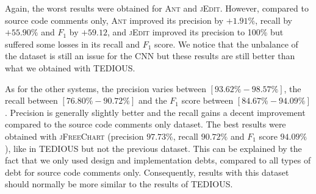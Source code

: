 \begin{table}[t]
	\caption{Within-project prediction: results of CNN for each system using source code with comments}
	\label{tab:comments}
	\centering\scriptsize
	\vspace{-3mm}
\end{table}

Again, the worst results were obtained for \textsc{Ant} and \textsc{jEdit}. However, compared to source code comments only, \textsc{Ant} improved its precision by $+ 1.91\%$, recall by $+ 55.90\%$ and $F_1$ by $+ 59.12$, and \textsc{jEdit} improved its precision to 100\% but suffered some losses in its recall and $F_1$ score. We notice that the unbalance of the dataset is still an issue for the CNN but these results are still better than what we obtained with TEDIOUS.

As for the other systems, the precision varies between $[93.62\%-98.57\%]$, the recall between $[76.80\%-90.72\%]$ and the $F_1$ score between $[84.67\%-94.09\%]$. Precision is generally slightly better and the recall gains a decent improvement compared to the source code comments only dataset. The best results were obtained with \textsc{jFreeChart} (precision $97.73\%$, recall $90.72\%$ and $F_1$ score $94.09\%$), like in TEDIOUS but not the previous dataset. This can be explained by the fact that we only used design and implementation debts, compared to all types of debt for source code comments only. Consequently, results with this dataset should normally be more similar to the results of TEDIOUS.

